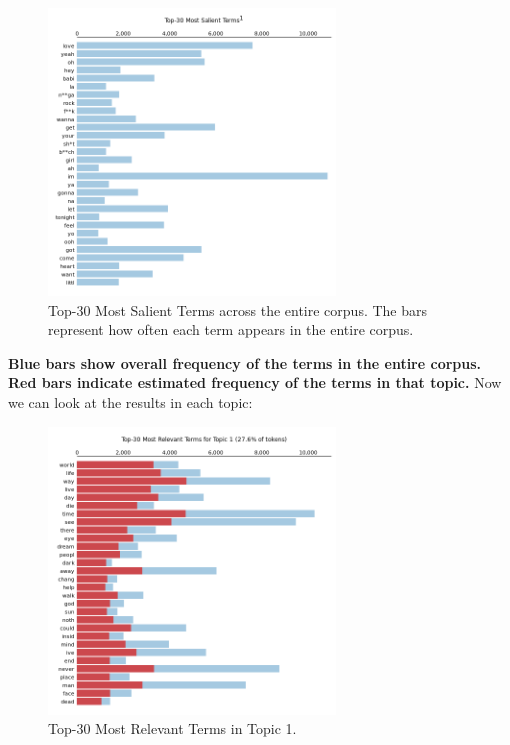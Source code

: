 \begin{center}
\begin{figure}[H]
  \centering
  \includegraphics[width=3in]{img/topics/png/general.png}
  \caption{Top-30 Most Salient Terms across the entire corpus. The bars
  represent how often each term appears in the entire corpus.}
  \label{Figure:fig_eh}
\end{figure}
\end{center}

 \textbf{Blue bars show overall frequency of the terms in the entire corpus.
 Red bars indicate estimated frequency of the terms in that topic.} Now we can
 look at the results in each topic:

\begin{center}
\begin{figure}[H]
  \centering
  \includegraphics[width=3in]{img/topics/png/t1.png}
  \caption{Top-30 Most Relevant Terms in Topic 1.}
  \label{Figure:t1}
\end{figure}
\end{center}

